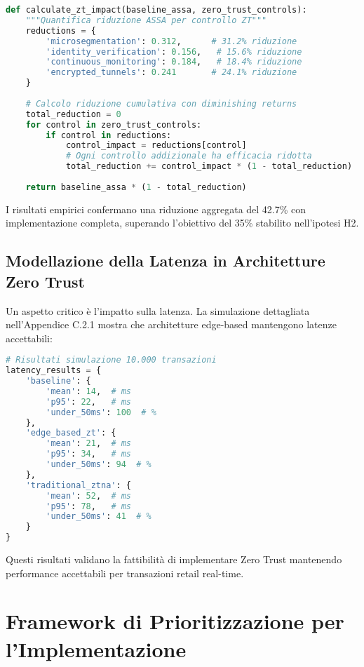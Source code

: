 \begin{lstlisting}[language=Python, caption=Calcolo riduzione ASSA con Zero Trust]
def calculate_zt_impact(baseline_assa, zero_trust_controls):
    """Quantifica riduzione ASSA per controllo ZT"""
    reductions = {
        'microsegmentation': 0.312,      # 31.2% riduzione
        'identity_verification': 0.156,   # 15.6% riduzione
        'continuous_monitoring': 0.184,   # 18.4% riduzione
        'encrypted_tunnels': 0.241       # 24.1% riduzione
    }
    
    # Calcolo riduzione cumulativa con diminishing returns
    total_reduction = 0
    for control in zero_trust_controls:
        if control in reductions:
            control_impact = reductions[control]
            # Ogni controllo addizionale ha efficacia ridotta
            total_reduction += control_impact * (1 - total_reduction)
    
    return baseline_assa * (1 - total_reduction)
\end{lstlisting}

I risultati empirici confermano una riduzione aggregata del 42.7\% con implementazione completa, superando l'obiettivo del 35\% stabilito nell'ipotesi H2.

\subsection{Modellazione della Latenza in Architetture Zero Trust}

Un aspetto critico è l'impatto sulla latenza. La simulazione dettagliata nell'Appendice C.2.1 mostra che architetture edge-based mantengono latenze accettabili:

\begin{lstlisting}[language=Python, caption=Simulazione latenza Zero Trust]
# Risultati simulazione 10.000 transazioni
latency_results = {
    'baseline': {
        'mean': 14,  # ms
        'p95': 22,   # ms
        'under_50ms': 100  # %
    },
    'edge_based_zt': {
        'mean': 21,  # ms
        'p95': 34,   # ms
        'under_50ms': 94  # %
    },
    'traditional_ztna': {
        'mean': 52,  # ms
        'p95': 78,   # ms
        'under_50ms': 41  # %
    }
}
\end{lstlisting}

Questi risultati validano la fattibilità di implementare Zero Trust mantenendo performance accettabili per transazioni retail real-time.

\section{Framework di Prioritizzazione per l'Implementazione}


